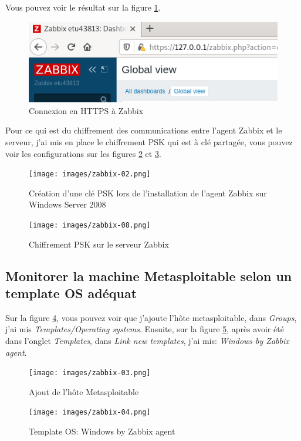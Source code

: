 \documentclass[a4paper]{article}
\begin{document}
Vous pouvez voir le résultat sur la figure \ref{fig:zabbix61}.

\begin{figure}[H]
    \centering
    \includegraphics[width=0.55\linewidth]{images/zabbix-61.png}
    \caption{Connexion en HTTPS à Zabbix}
    \label{fig:zabbix61}
\end{figure}

Pour ce qui est du chiffrement des communications entre l'agent Zabbix et le serveur, j'ai mis en place le chiffrement PSK qui est à clé partagée, vous pouvez voir les configurations sur les figures \ref{fig:zabbix02} et \ref{fig:zabbix08}.

\begin{figure}[H]
    \centering
    \texttt{[image: images/zabbix-02.png]}
    \caption{Création d'une clé PSK lors de l'installation de l'agent Zabbix sur Windows Server 2008}
    \label{fig:zabbix02}
\end{figure}
\begin{figure}[H]
    \centering
    \texttt{[image: images/zabbix-08.png]}
    \caption{Chiffrement PSK sur le serveur Zabbix}
    \label{fig:zabbix08}
\end{figure}










\newpage \subsection{Monitorer la machine Metasploitable selon un template OS adéquat}





Sur la figure \ref{fig:zabbix03}, vous pouvez voir que j'ajoute l'hôte metasploitable, dans \textit{Groups}, j'ai mis \textit{Templates/Operating systems}. Ensuite, sur la figure \ref{fig:zabbix04}, après avoir été dans l'onglet \textit{Templates}, dans \textit{Link new templates}, j'ai mis: \textit{Windows by Zabbix agent}.

\begin{figure}[H]
    \centering
    \texttt{[image: images/zabbix-03.png]}
    \caption{Ajout de l'hôte Metasploitable}
    \label{fig:zabbix03}
\end{figure}
\begin{figure}[H]
    \centering
    \texttt{[image: images/zabbix-04.png]}
    \caption{Template OS: Windows by Zabbix agent}
    \label{fig:zabbix04}
\end{figure}
\end{document}

